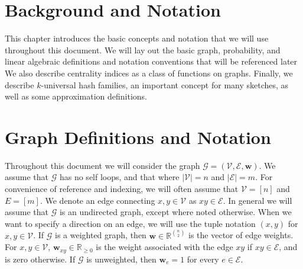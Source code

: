 \documentclass[10]{article}
\begin{document}
\section{Background and Notation} \label{chap:background}

This chapter introduces the basic concepts and notation that we will use throughout this document.
We will lay out the basic graph, probability, and linear algebraic definitions and notation conventions that will be referenced later
We also describe centrality indices as a class of functions on graphs.
Finally, we describe $k$-universal hash families, an important concept for many sketches, as well as some approximation definitions.



\section{Graph Definitions and Notation} \label{background:sec:graphdef}

Throughout this document we will consider the graph $\mathcal{G} = (\mathcal{V}, \mathcal{E}, \mathbf{w})$.
We assume that $\mathcal{G}$ has no self loops, and that where $|\mathcal{V}| = n$ and $|\mathcal{E}| = m$.
For convenience of reference and indexing, we will often assume that $\mathcal{V} = [n]$ and $E = [m]$. 
We denote an edge connecting $x, y \in \mathcal{V}$ as $xy \in \mathcal{E}$. 
In general we will assume that $\mathcal{G}$ is an  undirected graph, except where noted otherwise. 
When we want to specify a direction on an edge, we will use the tuple notation $(x, y)$ for $x, y \in \mathcal{V}$.
If $\mathcal{G}$ is a weighted graph, then $\mathbf{w} \in \mathbb{R}^{{n \choose 2}}$ is the vector of edge weights. 
For $x, y \in \mathcal{V}$, $\mathbf{w}_{xy} \in \mathbb{R}_{\geq 0}$ is the weight associated with the edge $xy$ if $xy \in \mathcal{E}$, and is zero otherwise.
If $\mathcal{G}$ is unweighted, then $\mathbf{w}_e = 1$ for every $e \in \mathcal{E}$. 
\end{document}
